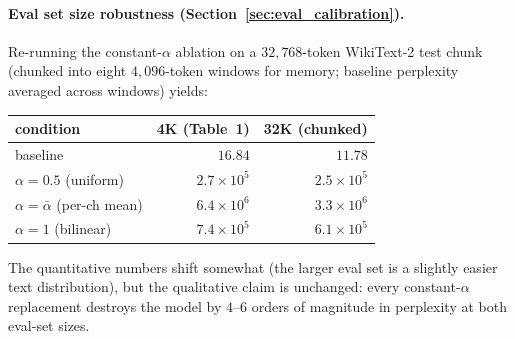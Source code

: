 \paragraph{Eval set size robustness (Section~\ref{sec:eval_calibration}).}
Re-running the constant-$\alpha$ ablation on a $32{,}768$-token WikiText-2
test chunk (chunked into eight $4{,}096$-token windows for memory; baseline
perplexity averaged across windows) yields:
%
\begin{center}
\begin{tabular}{lrr}
\toprule
condition & 4K (Table~1) & 32K (chunked) \\
\midrule
baseline                       & $16.84$       & $11.78$ \\
$\alpha=0.5$ (uniform)         & $2.7\times10^{5}$ & $2.5\times10^{5}$ \\
$\alpha=\bar\alpha$ (per-ch mean) & $6.4\times10^{6}$ & $3.3\times10^{6}$ \\
$\alpha=1$ (bilinear)          & $7.4\times10^{5}$ & $6.1\times10^{5}$ \\
\bottomrule
\end{tabular}
\end{center}
%
The quantitative numbers shift somewhat (the larger eval set is a slightly
easier text distribution), but the qualitative claim is unchanged: every
constant-$\alpha$ replacement destroys the model by $4$--$6$ orders of
magnitude in perplexity at both eval-set sizes.

